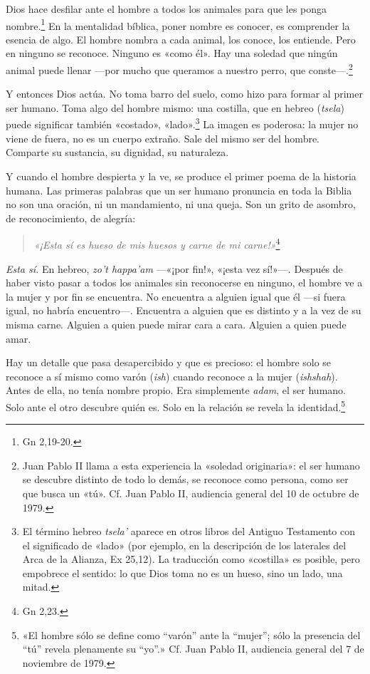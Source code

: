 Dios hace desfilar ante el hombre a todos los animales para que les ponga nombre.\footnote{Gn 2,19-20.} En la mentalidad bíblica, poner nombre es conocer, es comprender la esencia de algo. El hombre nombra a cada animal, los conoce, los entiende. Pero en ninguno se reconoce. Ninguno es «como él». Hay una soledad que ningún animal puede llenar ---por mucho que queramos a nuestro perro, que conste---.\footnote{Juan Pablo II llama a esta experiencia la «soledad originaria»: el ser humano se descubre distinto de todo lo demás, se reconoce como persona, como ser que busca un «tú». Cf. Juan Pablo II, audiencia general del 10 de octubre de 1979.}

Y entonces Dios actúa. No toma barro del suelo, como hizo para formar al primer ser humano. Toma algo del hombre mismo: una costilla, que en hebreo (\textit{tsela}) puede significar también «costado», «lado».\footnote{El término hebreo \textit{tsela'} aparece en otros libros del Antiguo Testamento con el significado de «lado» (por ejemplo, en la descripción de los laterales del Arca de la Alianza, Ex 25,12). La traducción como «costilla» es posible, pero empobrece el sentido: lo que Dios toma no es un hueso, sino un lado, una mitad.} La imagen es poderosa: la mujer no viene de fuera, no es un cuerpo extraño. Sale del mismo ser del hombre. Comparte su sustancia, su dignidad, su naturaleza.

Y cuando el hombre despierta y la ve, se produce el primer poema de la historia humana. Las primeras palabras que un ser humano pronuncia en toda la Biblia no son una oración, ni un mandamiento, ni una queja. Son un grito de asombro, de reconocimiento, de alegría:

\begin{quotation}
\textit{«¡Esta sí es hueso de mis huesos y carne de mi carne!»}\footnote{Gn 2,23.}
\end{quotation}

\textit{Esta sí.} En hebreo, \textit{zo't happa'am} ---«¡por fin!», «¡esta vez sí!»---. Después de haber visto pasar a todos los animales sin reconocerse en ninguno, el hombre ve a la mujer y por fin se encuentra. No encuentra a alguien igual que él ---si fuera igual, no habría encuentro---. Encuentra a alguien que es distinto y a la vez de su misma carne. Alguien a quien puede mirar cara a cara. Alguien a quien puede amar.

Hay un detalle que pasa desapercibido y que es precioso: el hombre solo se reconoce a sí mismo como varón (\textit{ish}) cuando reconoce a la mujer (\textit{ishshah}). Antes de ella, no tenía nombre propio. Era simplemente \textit{adam}, el ser humano. Solo ante el otro descubre quién es. Solo en la relación se revela la identidad.\footnote{«El hombre sólo se define como ``varón'' ante la ``mujer''; sólo la presencia del ``tú'' revela plenamente su ``yo''.» Cf. Juan Pablo II, audiencia general del 7 de noviembre de 1979.}

